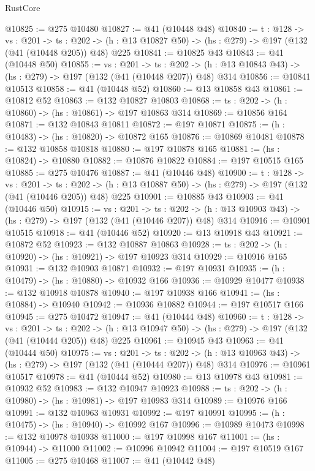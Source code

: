 \begin{lexlean}{RustCore}
\begin{coremodule}
@10825 := @275 @10480
@10827 := @41 (@10448 @48)
@10840 := {t : @128} ->
  {vs : @201} ->
  {ts : @202} -> (h : @13 @10827 @50) -> (hs : @279) -> @197 (@132 (@41 (@10448 @205)) @48) @225
@10841 := @10825 @43
@10843 := @41 (@10448 @50)
@10855 := {vs : @201} ->
  {ts : @202} -> (h : @13 @10843 @43) -> (hs : @279) -> @197 (@132 (@41 (@10448 @207)) @48) @314
@10856 := @10841 @10513
@10858 := @41 (@10448 @52)
@10860 := @13 @10858 @43
@10861 := @10812 @52
@10863 := @132 @10827 @10803
@10868 := {ts : @202} -> (h : @10860) -> (hs : @10861) -> @197 @10863 @314
@10869 := @10856 @164
@10871 := @132 @10843 @10811
@10872 := @197 @10871
@10875 := (h : @10483) -> (hs : @10820) -> @10872 @165
@10876 := @10869 @10481
@10878 := @132 @10858 @10818
@10880 := @197 @10878 @165
@10881 := (hs : @10824) -> @10880
@10882 := @10876 @10822
@10884 := @197 @10515 @165
@10885 := @275 @10476
@10887 := @41 (@10446 @48)
@10900 := {t : @128} ->
  {vs : @201} ->
  {ts : @202} -> (h : @13 @10887 @50) -> (hs : @279) -> @197 (@132 (@41 (@10446 @205)) @48) @225
@10901 := @10885 @43
@10903 := @41 (@10446 @50)
@10915 := {vs : @201} ->
  {ts : @202} -> (h : @13 @10903 @43) -> (hs : @279) -> @197 (@132 (@41 (@10446 @207)) @48) @314
@10916 := @10901 @10515
@10918 := @41 (@10446 @52)
@10920 := @13 @10918 @43
@10921 := @10872 @52
@10923 := @132 @10887 @10863
@10928 := {ts : @202} -> (h : @10920) -> (hs : @10921) -> @197 @10923 @314
@10929 := @10916 @165
@10931 := @132 @10903 @10871
@10932 := @197 @10931
@10935 := (h : @10479) -> (hs : @10880) -> @10932 @166
@10936 := @10929 @10477
@10938 := @132 @10918 @10878
@10940 := @197 @10938 @166
@10941 := (hs : @10884) -> @10940
@10942 := @10936 @10882
@10944 := @197 @10517 @166
@10945 := @275 @10472
@10947 := @41 (@10444 @48)
@10960 := {t : @128} ->
  {vs : @201} ->
  {ts : @202} -> (h : @13 @10947 @50) -> (hs : @279) -> @197 (@132 (@41 (@10444 @205)) @48) @225
@10961 := @10945 @43
@10963 := @41 (@10444 @50)
@10975 := {vs : @201} ->
  {ts : @202} -> (h : @13 @10963 @43) -> (hs : @279) -> @197 (@132 (@41 (@10444 @207)) @48) @314
@10976 := @10961 @10517
@10978 := @41 (@10444 @52)
@10980 := @13 @10978 @43
@10981 := @10932 @52
@10983 := @132 @10947 @10923
@10988 := {ts : @202} -> (h : @10980) -> (hs : @10981) -> @197 @10983 @314
@10989 := @10976 @166
@10991 := @132 @10963 @10931
@10992 := @197 @10991
@10995 := (h : @10475) -> (hs : @10940) -> @10992 @167
@10996 := @10989 @10473
@10998 := @132 @10978 @10938
@11000 := @197 @10998 @167
@11001 := (hs : @10944) -> @11000
@11002 := @10996 @10942
@11004 := @197 @10519 @167
@11005 := @275 @10468
@11007 := @41 (@10442 @48)

\end{coremodule}
\end{lexlean}
